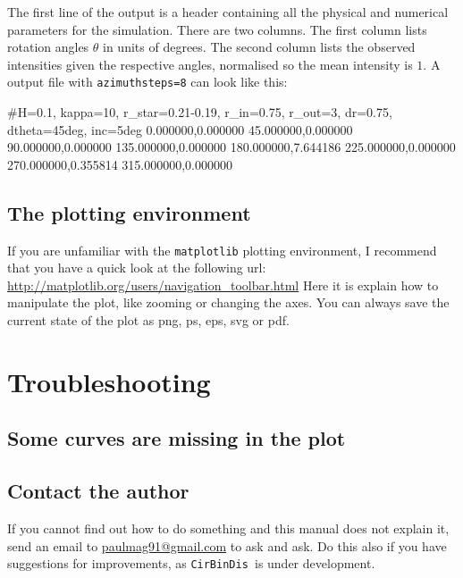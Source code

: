 \documentclass[a4paper, 12pt, english, titlepage]{article}
\newcommand{\sname}{\texttt{CirBinDis }}
\begin{document}
    The first line of the output is a header containing all the physical and numerical parameters for the simulation. There are two columns. The first column lists rotation angles $\theta$ in units of degrees. The second column lists the observed intensities given the respective angles, normalised so the mean intensity is $1$. A output file with \texttt{azimuthsteps=8} can look like this:
\begin{verbatim*}
#H=0.1, kappa=10, r_star=0.21-0.19, r_in=0.75, r_out=3, dr=0.75,
dtheta=45deg, inc=5deg
0.000000,0.000000
45.000000,0.000000
90.000000,0.000000
135.000000,0.000000
180.000000,7.644186
225.000000,0.000000
270.000000,0.355814
315.000000,0.000000
\end{verbatim*}

\subsection{The plotting environment}
    If you are unfamiliar with the \texttt{matplotlib} plotting environment, I recommend that you have a quick look at the following url: \url{http://matplotlib.org/users/navigation_toolbar.html}
    Here it is explain how to manipulate the plot, like zooming or changing the axes. 
    You can always save the current state of the plot as png, ps, eps, svg or pdf.



\section{Troubleshooting}

\subsection{Some curves are missing in the plot}

\subsection{Contact the author}
    If you cannot find out how to do something and this manual does not explain it,
    send an email to \href{mailto:paulmag91@gmail.com}{paulmag91@gmail.com} to ask and ask.
    Do this also if you have suggestions for improvements, as \sname is under development.


\end{document}
